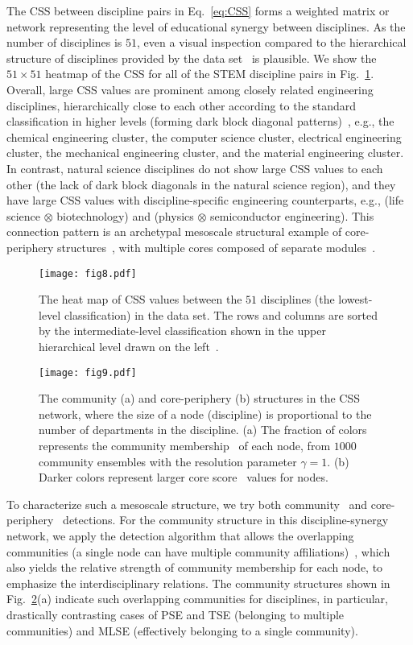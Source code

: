 \documentclass{bmcart}
\begin{document}
The CSS between discipline pairs in Eq.~\eqref{eq:CSS} forms a weighted matrix or network representing the level of educational synergy between disciplines. As the number of disciplines is $51$, even a visual inspection compared to the hierarchical structure of disciplines provided by the data set~\cite{data_go_kr} is plausible. 
We show the $51 \times 51$ heatmap of the CSS for all of the STEM discipline pairs 
in Fig.~\ref{figure: heatmapt}. 
Overall, large CSS values are prominent among closely related engineering disciplines, hierarchically close to each other according to the standard classification in higher levels (forming dark block diagonal patterns)~\cite{data_go_kr}, e.g., the chemical engineering cluster, the computer science cluster, electrical engineering cluster,
the mechanical engineering cluster, and the material engineering cluster. 
In contrast, natural science disciplines do not show large CSS values to each other (the lack of dark block diagonals in the natural science region), and they have large CSS values with discipline-specific engineering counterparts, e.g., (life science $\otimes$ biotechnology) and (physics $\otimes$ semiconductor engineering). This connection pattern is an archetypal mesoscale structural example of core-periphery structures~\cite{Rombac2014}, with multiple cores composed of separate modules~\cite{Kojaku2018}.

\begin{figure}
\centering
\texttt{[image: fig8.pdf]} 
\caption{The heat map of CSS values between the $51$ disciplines (the lowest-level classification) in the data set. The rows and columns are sorted by the intermediate-level classification shown in the upper hierarchical level drawn on the left~\cite{data_go_kr}.}
\label{figure: heatmapt}
\end{figure}

\begin{figure}
\centering
\texttt{[image: fig9.pdf]} 
\caption{The community (a) and core-periphery (b) structures in the CSS network, where the size of a node (discipline) is proportional to the number of departments in the discipline. (a) The fraction of colors represents the community membership~\cite{Gupta2023} of each node, from $1000$ community ensembles with the resolution parameter $\gamma = 1$. (b) Darker colors represent larger core score~\cite{Rombac2014} values for nodes.
}
\label{figure: final networks}
\end{figure}

To characterize such a mesoscale structure, we try both community~\cite{Porter2009, Fortunato2010} and core-periphery~\cite{Rombac2014} detections. For the community structure in this discipline-synergy network, we apply the detection algorithm that allows the overlapping communities (a single node can have multiple community affiliations)~\cite{Gupta2023}, which also yields the relative strength of community membership for each node, to emphasize the interdisciplinary relations. The community structures shown in Fig.~\ref{figure: final networks}(a) indicate such overlapping communities for disciplines, in particular, drastically contrasting cases of PSE and TSE (belonging to multiple communities) and MLSE (effectively belonging to a single community).
\end{document}
